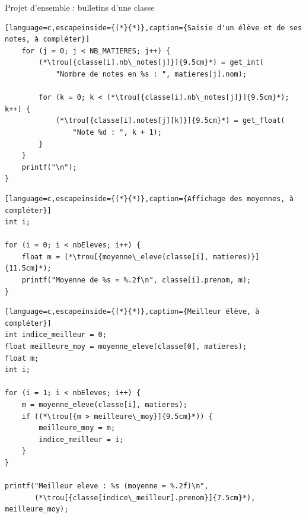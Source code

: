 \begin{UPSTIexercice}{Projet d'ensemble : bulletins d'une classe}
\begin{lstlisting}[language=c,escapeinside={(*}{*)},caption={Saisie d'un élève et de ses notes, à compléter}]
    for (j = 0; j < NB_MATIERES; j++) {
        (*\trou[{classe[i].nb\_notes[j]}]{9.5cm}*) = get_int(
            "Nombre de notes en %s : ", matieres[j].nom);

        for (k = 0; k < (*\trou[{classe[i].nb\_notes[j]}]{9.5cm}*); k++) {
            (*\trou[{classe[i].notes[j][k]}]{9.5cm}*) = get_float(
                "Note %d : ", k + 1);
        }
    }
    printf("\n");
}
\end{lstlisting}



\begin{lstlisting}[language=c,escapeinside={(*}{*)},caption={Affichage des moyennes, à compléter}]
int i;

for (i = 0; i < nbEleves; i++) {
    float m = (*\trou[{moyenne\_eleve(classe[i], matieres)}]{11.5cm}*);
    printf("Moyenne de %s = %.2f\n", classe[i].prenom, m);
}
\end{lstlisting}



\begin{lstlisting}[language=c,escapeinside={(*}{*)},caption={Meilleur élève, à compléter}]
int indice_meilleur = 0;
float meilleure_moy = moyenne_eleve(classe[0], matieres);
float m;
int i;

for (i = 1; i < nbEleves; i++) {
    m = moyenne_eleve(classe[i], matieres);
    if ((*\trou[{m > meilleure\_moy}]{9.5cm}*)) {
        meilleure_moy = m;
        indice_meilleur = i;
    }
}

printf("Meilleur eleve : %s (moyenne = %.2f)\n",
       (*\trou[{classe[indice\_meilleur].prenom}]{7.5cm}*), meilleure_moy);
\end{lstlisting}




\end{UPSTIexercice}
